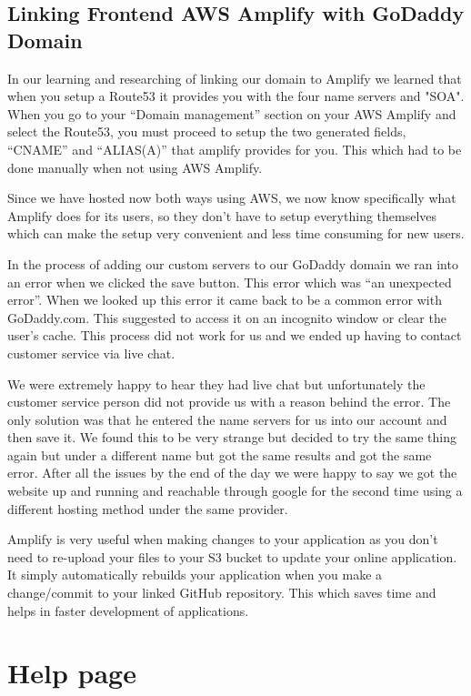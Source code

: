 \subsection{Linking Frontend AWS Amplify with GoDaddy Domain}

In our learning and researching of linking our domain to Amplify we learned that when you setup a Route53 it provides you with the four name servers and "SOA". When you go to your “Domain management” section on your AWS Amplify and select the Route53\cite{ref20}, you must proceed to setup the two generated fields, “CNAME” and “ALIAS(A)” that amplify provides for you. This which had to be done manually when not using AWS Amplify.


Since we have hosted now both ways using AWS, we now know specifically what Amplify does for its users, so they don’t have to setup everything themselves which can make the setup very convenient and less time consuming for new users.\hfill \break

In the process of adding our custom servers to our GoDaddy domain we ran into an error when we clicked the save button. This error which was “an unexpected error”. When we looked up this error it came back to be a common error with GoDaddy.com. This suggested to access it on an incognito window or clear the user’s cache. This process did not work for us and we ended up having to contact customer service via live chat.\hfill \break

We were extremely happy to hear they had live chat but unfortunately the customer service person did not provide us with a reason behind the error. The only solution was that he entered the name servers for us into our account and then save it. We found this to be very strange but decided to try the same thing again but under a different name but got the same results and got the same error. After all the issues by the end of the day we were happy to say we got the website up and running and reachable through google for the second time using a different hosting method under the same provider.\hfill \break

Amplify is very useful when making changes to your application as you don’t need to re-upload your files to your S3 bucket\cite{ref19} to update your online application. It simply automatically rebuilds your application when you make a change/commit to your linked GitHub repository. This which saves time and helps in faster development of applications.

\section{Help page}


